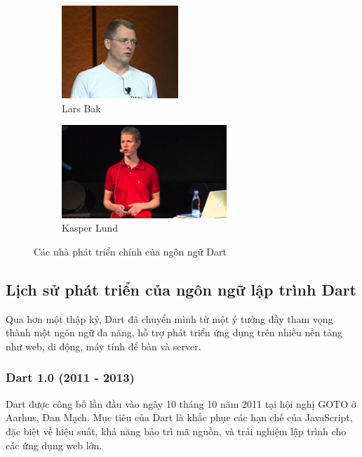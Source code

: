 \documentclass[../DoAn.tex]{subfiles}
\numberwithin{figure}{chapter}
\begin{document}
\begin{figure}[H]
    \centering
    \begin{subfigure}[b]{0.35\textwidth}
        \centering
        \includegraphics[width=\textwidth,height=3.5cm,keepaspectratio]{Hinhve/Lars_Bak.png}
        \caption{Lars Bak}
        \label{subfig:lars_bak}
    \end{subfigure}%
    \hspace{0.5cm} 
    \begin{subfigure}[b]{0.42\textwidth}
        \centering
        \includegraphics[width=\textwidth,height=3.5cm,keepaspectratio]{Hinhve/KasperLund.jpg}
        \caption{Kasper Lund}
        \label{subfig:kasper_lund}
    \end{subfigure}
    \caption{Các nhà phát triển chính của ngôn ngữ Dart}
    \label{fig:dart_developers}
\end{figure}

\subsection{Lịch sử phát triển của ngôn ngữ lập trình Dart}

Qua hơn một thập kỷ, Dart đã chuyển mình từ một ý tưởng đầy tham vọng thành một ngôn ngữ đa năng, hỗ trợ phát triển ứng dụng trên nhiều nền tảng như web, di động, máy tính để bàn và server.

\subsubsection{Dart 1.0 (2011 - 2013)}
Dart được công bố lần đầu vào ngày 10 tháng 10 năm 2011 tại hội nghị GOTO ở Aarhus, Đan Mạch. Mục tiêu của Dart là khắc phục các hạn chế của JavaScript, đặc biệt về hiệu suất, khả năng bảo trì mã nguồn, và trải nghiệm lập trình cho các ứng dụng web lớn. 
\end{document}
